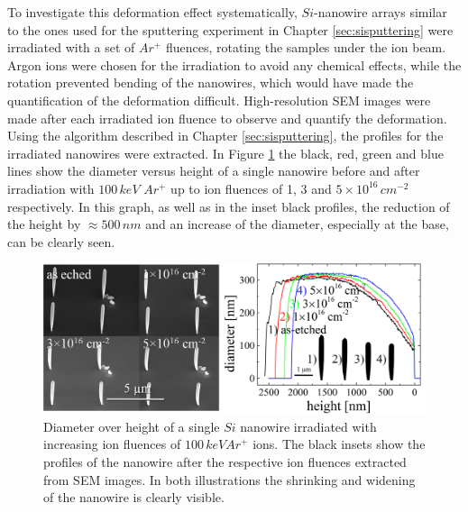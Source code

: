 To investigate this deformation effect systematically, $Si$-nanowire arrays similar to the ones used for the sputtering experiment in Chapter \ref{sec:sisputtering} were irradiated with a set of $Ar^+$ fluences, rotating the samples under the ion beam. Argon ions were chosen for the irradiation to avoid any chemical effects, while the rotation prevented bending of the nanowires, which would have made the quantification of the deformation difficult.  High-resolution SEM images were made after each irradiated ion fluence to observe and quantify the deformation. Using the algorithm described in Chapter \ref{sec:sisputtering}, the profiles for the irradiated nanowires were extracted. In Figure \ref{deformationprofile} the black, red, green and blue lines show the diameter versus height of a single nanowire before and after irradiation with $100\,keV\,\,Ar^+$ up to ion fluences of 1, 3 and $5 \times 10^{16}\,cm^{-2}$ respectively. In this graph, as well as in the inset black profiles, the reduction of the height by $\approx 500\,nm$ and an increase of the diameter, especially at the base, can be clearly seen. 


\begin{figure}[thbp]
	\centering
		\includegraphics[width=.99\textwidth]{images/deformationprofileandSEM.jpg}
		\caption{Diameter over height of a single $Si$ nanowire irradiated with increasing ion fluences of $100\,keV Ar^+$ ions. The black insets show the profiles of the nanowire after the respective ion fluences extracted from SEM images. In both illustrations the shrinking and widening of the nanowire is clearly visible.} 
	\label{deformationprofile} 
\end{figure}

